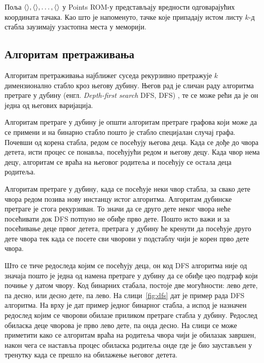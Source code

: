 \documentclass[master]{finthesis}
\makeatletter
\newcommand*{\engl}[2][\@empty]{%
    \edef\theacronym{#1}%
    (енгл. \foreignlanguage{english}{\emph{#2}%
    \ifx\theacronym\@empty \else , #1\fi})%
}
\newcommand*{\kdim}[1]{\texorpdfstring{$k$\Hyphdash}{k-}димензионал#1}
\newcommand*{\kd}{\texorpdfstring{$k$}{k}-д }
\newcommand*{\correctmath}[1]{%
    \ifcsname mathCorrectionFor#1\endcsname%
        \csname mathCorrectionFor#1\endcsname%
    \else%
        #1%
    \fi%
}
\newcommand*{\mfield}[1]{{\langle\correctmath{#1}\/\rangle}}
\makeatother
\begin{document}
Поља $\mfield{p_0}, \mfield{p_1}, \dots, \mfield{p_{k-1}}$ у Points ROM-у представљају вредности одговарајућих координата тачака. Као што је напоменуто, тачке које припадају истом листу \kd стабла заузимају узастопна места у меморији.

\subsection{Алгоритам претраживања}

Алгоритам претраживања најближег суседа рекурзивно претражује \kdim{но} стабло кроз његову дубину. Његов рад је сличан раду алгоритма претраге у дубину \engl[DFS]{Depth-first search}, те се може рећи да је он једна од његових варијација.

Алгоритам претраге у дубину је општи алгоритам претраге графова који може да се примени и на бинарно стабло пошто је стабло специјалан случај графа. Почевши од корена стабла, редом се посећују његова деца. Када се дође до чвора детета, исти процес се понавља, посећујући редом и његову децу. Када чвор нема децу, алгоритам се враћа на његовог родитеља и посећују се остала деца родитеља.

Алгоритам претраге у дубину, када се посећује неки чвор стабла, за свако дете чвора редом позива нову инстанцу истог алгоритма. Алгоритам дубинске претраге је стога рекурзиван. То значи да се друго дете неког чвора неће посећивати док DFS потпуно не обиђе прво дете. Пошто исто важи и за посећивање деце првог детета, претрага у дубину ће кренути да посећује друго дете чвора тек када се посете сви чворови у подстаблу чији је корен прво дете чвора.

Што се тиче редоследа којим се посећују деца, он код DFS алгоритма није од значаја пошто је једна од намена претраге у дубину да се обиђе цео подграф који почиње у датом чвору. Код бинарних стабала, постоје две могућности: лево дете, па десно, или десно дете, па лево. На слици~\ref{fig:dfs} дат је пример рада DFS алгоритма. На врху је дат пример једног бинарног стабла, а испод је назначен редослед којим се чворови обилазе приликом претраге стабла у дубину. Редослед обиласка деце чворова је прво лево дете, па онда десно. На слици се може приметити како се алгоритам враћа на родитеља чвора чији је обилазак завршен, након чега се наставља процес обиласка родитеља онде где је био заустављен у тренутку када се прешло на обилажење његовог детета.
\end{document}
